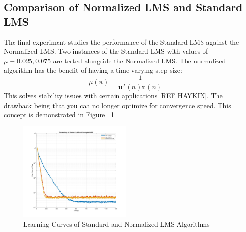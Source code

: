 \documentclass[journal]{IEEEtran}
\begin{document}
\subsection{Comparison of Normalized LMS and Standard LMS}
The final experiment studies the performance of the Standard LMS against the Normalized LMS. Two instances of the
Standard LMS with values of $\mu = 0.025, 0.075$ are tested alongside the Normalized LMS. The normalized algorithm has the
benefit of having a time-varying step size:
$$\mu(n) = \dfrac{1}{\boldsymbol{u}^T(n)\boldsymbol{u}(n)}$$
This solves stability issues with certain applications [REF HAYKIN]. The drawback being that you can no longer
optimize for convergence speed. This concept is demonstrated in Figure ~\ref{fig:normalizedlms}
\begin{figure}[H]
  \centering
  \captionsetup{justification=centering,font = small}
  \includegraphics[width=0.50\textwidth, right] {Plots/Project1_Part5.jpg}
  \caption{Learning Curves of Standard and Normalized LMS Algorithms}
    \label{fig:normalizedlms}
\end{figure}

\end{document}
